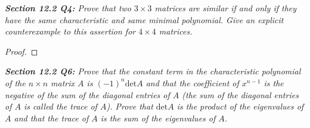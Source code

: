 \documentclass{article}
\begin{document}
\it \textbf{Section 12.2 Q4:} Prove that two $3\times3$ matrices are
  similar if and only if they have the same characteristic and same minimal
  polynomial. Give an explicit counterexample to this assertion for
  $4\times4$ matrices.

  \begin{proof}
  \end{proof}

\it \textbf{Section 12.2 Q6:} Prove that the constant term in the
  characteristic polynomial of the $n\times n$ matrix $A$ is
  $(-1)^n\text{det}A$ and that the coefficient of $x^{n-1}$ is the negative
  of the sum of the diagonal entries of $A$ (the sum of the diagonal
  entries of $A$ is called the trace of $A$). Prove that $\text{det}A$ is
  the product of the eigenvalues of $A$ and that the trace of $A$ is the
  sum of the eigenvalues of $A$.
\end{document}
